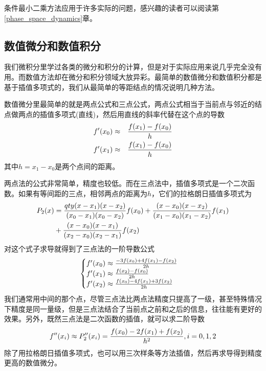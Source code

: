 \documentclass[12pt,a4paper,openany,twoside]{book}
\numberwithin{equation}{section}
\begin{document}
            条件最小二乘方法应用于许多实际的问题，感兴趣的读者可以阅读第\ref{phase_space_dynamics}章。

          \subsection{数值微分和数值积分}
            \label{numerical_differential_integral}
            我们微积分里学过各类的微分和积分的计算，但是对于实际应用来说几乎完全没有用。而数值方法却在微分和积分领域大放异彩。最简单的数值微分和数值积分都是基于插值多项式的，我们从最简单的等距结点的情况说明几种方法。

            数值微分里最简单的就是两点公式和三点公式，两点公式相当于当前点与邻近的结点做两点的插值多项式(直线)，然后用直线的斜率代替在这个点的导数
            \begin{equation}
              \begin{aligned}
                f'\qty(x_0)&\approx&\frac{f\qty(x_1)-f\qty(x_0)}{h}\\
                f'\qty(x_1)&\approx&\frac{f\qty(x_1)-f\qty(x_0)}{h}
              \end{aligned}
            \end{equation}
            其中$h=x_1-x_0$是两个点间的距离。
            
            两点法的公式非常简单，精度也较低。而在三点法中，插值多项式是一个二次函数。如果有等间距的三点，相邻两点的距离为$h$，它们的拉格朗日插值多项式为
            \begin{equation*}
              \begin{aligned}
                P_2\qty(x)&=\frac{qty(x-x_1)\qty(x-x_2)}{\qty(x_0-x_1)\qty(x_0-x_2)}f\qty(x_0)+\frac{\qty(x-x_0)\qty(x-x_2)}{\qty(x_1-x_0)\qty(x_1-x_2)}f\qty(x_1) \\
                &+\frac{\qty(x-x_0)\qty(x-x_1)}{\qty(x_2-x_0)\qty(x_2-x_1)}f\qty(x_2)
              \end{aligned}
            \end{equation*}
            对这个式子求导就得到了三点法的一阶导数公式
            \begin{equation}
              \begin{cases}
                f'\qty(x_0)\approx\frac{-3f\qty(x_0)+4f\qty(x_1)-f\qty(x_2)}{2h} \\
                f'\qty(x_1)\approx\frac{f\qty(x_2)-f\qty(x_0)}{2h} \\
                f'\qty(x_2)\approx\frac{f\qty(x_0)-4f\qty(x_1)+3f\qty(x_2)}{2h}
              \end{cases}
            \end{equation}
            我们通常用中间的那个点，尽管三点法比两点法精度只提高了一级，甚至特殊情况下精度是同一量级，但是三点法结合了当前点之前和之后的信息，往往能有更好的效果。另外，既然三点法是二次函数的插值，就可以求二阶导数
            \begin{equation}
              f''\qty(x_i)\approx P''_2\qty(x_i)=\frac{f\qty(x_0)-2f\qty(x_1)+f\qty(x_2)}{h^2}, i=0,1,2
            \end{equation}
            除了用拉格朗日插值多项式，也可以用三次样条等方法插值，然后再求导得到精度更高的数值微分。
\end{document}

